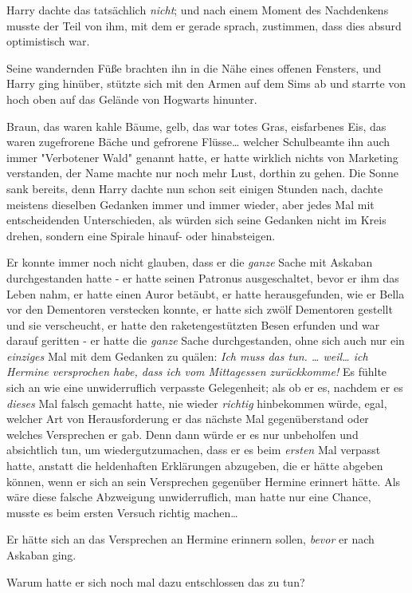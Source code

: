 {Harry dachte das tatsächlich \emph{nicht}; und nach einem Moment des Nachdenkens musste der Teil von ihm, mit dem er gerade sprach, zustimmen, dass dies absurd optimistisch war.

Seine wandernden Füße brachten ihn in die Nähe eines offenen Fensters, und Harry ging hinüber, stützte sich mit den Armen auf dem Sims ab und starrte von hoch oben auf das Gelände von Hogwarts hinunter.

Braun, das waren kahle Bäume, gelb, das war totes Gras, eisfarbenes Eis, das waren zugefrorene Bäche und gefrorene Flüsse… welcher Schulbeamte ihn auch immer "Verbotener Wald" genannt hatte, er hatte wirklich nichts von Marketing verstanden, der Name machte nur noch mehr Lust, dorthin zu gehen. Die Sonne sank bereits, denn Harry dachte nun schon seit einigen Stunden nach, dachte meistens dieselben Gedanken immer und immer wieder, aber jedes Mal mit entscheidenden Unterschieden, als würden sich seine Gedanken nicht im Kreis drehen, sondern eine Spirale hinauf- oder hinabsteigen.

Er konnte immer noch nicht glauben, dass er die \emph{ganze} Sache mit Askaban durchgestanden hatte - er hatte seinen Patronus ausgeschaltet, bevor er ihm das Leben nahm, er hatte einen Auror betäubt, er hatte herausgefunden, wie er Bella vor den Dementoren verstecken konnte, er hatte sich zwölf Dementoren gestellt und sie verscheucht, er hatte den raketengestützten Besen erfunden und war darauf geritten - er hatte die \emph{ganze} Sache durchgestanden, ohne sich auch nur ein \emph{einziges} Mal mit dem Gedanken zu quälen: \emph{Ich muss das tun. … weil… ich Hermine versprochen habe, dass ich vom Mittagessen zurückkomme!} Es fühlte sich an wie eine unwiderruflich verpasste Gelegenheit; als ob er es, nachdem er es \emph{dieses} Mal falsch gemacht hatte, nie wieder \emph{richtig} hinbekommen würde, egal, welcher Art von Herausforderung er das nächste Mal gegenüberstand oder welches Versprechen er gab. Denn dann würde er es nur unbeholfen und absichtlich tun, um wiedergutzumachen, dass er es beim \emph{ersten} Mal verpasst hatte, anstatt die heldenhaften Erklärungen abzugeben, die er hätte abgeben können, wenn er sich an sein Versprechen gegenüber Hermine erinnert hätte. Als wäre diese falsche Abzweigung unwiderruflich, man hatte nur eine Chance, musste es beim ersten Versuch richtig machen…

Er hätte sich an das Versprechen an Hermine erinnern sollen, \emph{bevor} er nach Askaban ging.

Warum hatte er sich noch mal dazu entschlossen das zu tun?

}
